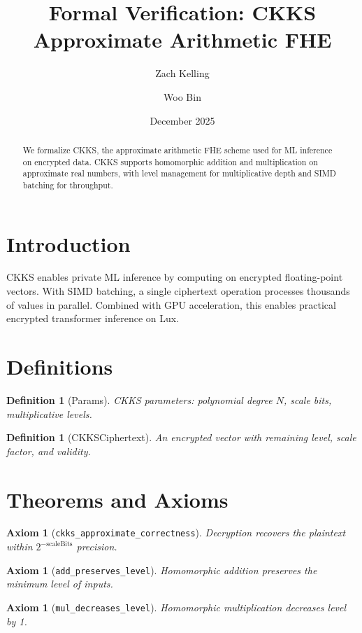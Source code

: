 \documentclass[11pt]{article}
\title{Formal Verification: CKKS Approximate Arithmetic FHE}
\author{Zach Kelling \and Woo Bin}
\date{December 2025}
\newtheorem{definition}[theorem]{Definition}
\newtheorem{axiom_stmt}[theorem]{Axiom}
\begin{document}
\maketitle

\begin{abstract}
We formalize CKKS, the approximate arithmetic FHE scheme used for ML inference on encrypted data. CKKS supports homomorphic addition and multiplication on approximate real numbers, with level management for multiplicative depth and SIMD batching for throughput.
\end{abstract}

\section{Introduction}
CKKS enables private ML inference by computing on encrypted floating-point vectors. With SIMD batching, a single ciphertext operation processes thousands of values in parallel. Combined with GPU acceleration, this enables practical encrypted transformer inference on Lux.

\section{Definitions}
\begin{definition}[Params]
CKKS parameters: polynomial degree $N$, scale bits, multiplicative levels.
\end{definition}

\begin{definition}[CKKSCiphertext]
An encrypted vector with remaining level, scale factor, and validity.
\end{definition}


\section{Theorems and Axioms}
\begin{axiom_stmt}[\texttt{ckks\_approximate\_correctness}]
Decryption recovers the plaintext within $2^{-\text{scaleBits}}$ precision.
\end{axiom_stmt}

\begin{axiom_stmt}[\texttt{add\_preserves\_level}]
Homomorphic addition preserves the minimum level of inputs.
\end{axiom_stmt}

\begin{axiom_stmt}[\texttt{mul\_decreases\_level}]
Homomorphic multiplication decreases level by 1.
\end{axiom_stmt}
\end{document}
